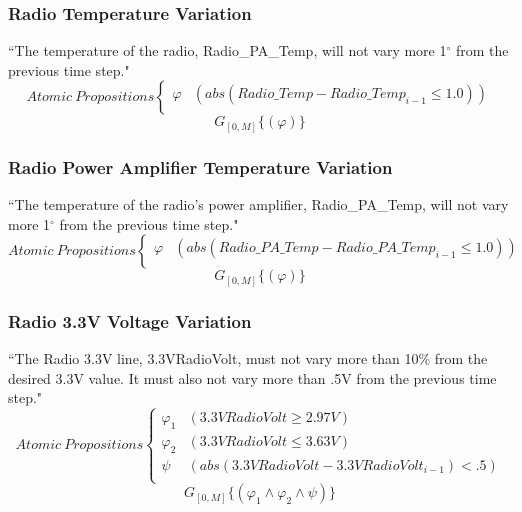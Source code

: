 \subsubsection{\textbf{Radio Temperature Variation}}
“The temperature of the radio, Radio\_PA\_Temp, will not vary more 1$^{\circ}$ from the previous time step."
\[ Atomic\:Propositions \begin{cases}
  \varphi & (abs(Radio\_Temp - Radio\_Temp_{i-1} \leq 1.0)) \\
\end{cases} \]
\begin{equation}
    \label{Spec 5}
    G_{[0,M]} \{(\varphi)\}
\end{equation} 

\subsubsection{\textbf{Radio Power Amplifier Temperature Variation}}
“The temperature of the radio's power amplifier, Radio\_PA\_Temp, will not vary more 1$^{\circ}$ from the previous time step."
\[ Atomic\:Propositions \begin{cases}
  \varphi & (abs(Radio\_PA\_Temp - Radio\_PA\_Temp_{i-1} \leq 1.0)) \\
\end{cases} \]
\begin{equation}
    \label{Spec 6}
    G_{[0,M]} \{(\varphi)\}
\end{equation} 

\subsubsection{\textbf{Radio 3.3V Voltage Variation}}
“The Radio 3.3V line, 3.3VRadioVolt, must not vary more than 10\% from the desired 3.3V value. It must also not vary more than .5V from the previous time step."
\[ Atomic\:Propositions \begin{cases}
  \varphi_1 & (3.3VRadioVolt \geq 2.97V) \\
  \varphi_2 & (3.3VRadioVolt \leq 3.63V) \\
  \psi & (abs(3.3VRadioVolt - 3.3VRadioVolt_{i-1}) < .5)\\
\end{cases} \]
\begin{equation}
    \label{Spec 7}
    G_{[0,M]} \{(\varphi_1 \wedge \varphi_2 \wedge \psi)\}
\end{equation} 

